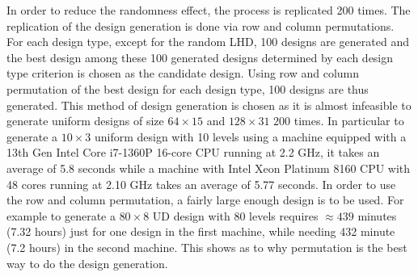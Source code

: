 \documentclass [PhD] {package/uclathes}
\begin{document}
In order to reduce the randomness effect, the process is replicated 200 times. The replication  of the design generation is done via row and column permutations.  For each design type, except for the random LHD, 100 designs are generated and the best design among these 100 generated designs determined by each design type criterion is chosen as the candidate design. Using row and column permutation of the best design for each design type, 100 designs are thus generated. This method of design generation is chosen as it is almost infeasible to generate uniform designs of size $64 \times 15$ and $128\times 31$ 200 times. In particular to generate a $10\times 3$ uniform design with 10 levels using a machine equipped with a 13th Gen Intel Core\texttrademark{} i7-1360P 16-core CPU running at 2.2 GHz, it takes an average of 5.8 seconds while a machine with Intel\textregistered{} Xeon\textregistered{} Platinum 8160 CPU with 48 cores running at 2.10 GHz takes an average of 5.77 seconds. In order to use the row and column permutation, a fairly large enough design is to be used. For example to generate a $80\times 8$ UD design with 80 levels requires $\approx 439$ minutes (7.32 hours) just for one design in the first machine, while needing 432 minute (7.2 hours) in the second machine. This shows as to why permutation is the best way to do the design generation.
\end{document}
